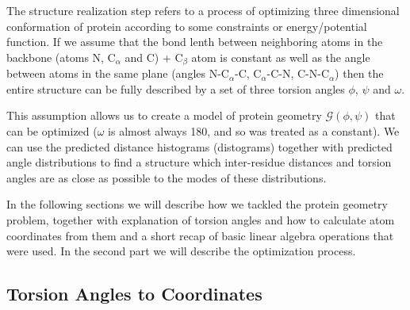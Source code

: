 The structure realization step refers to a process of optimizing three dimensional conformation of protein according to some constraints or energy/potential function. If we assume that the bond lenth between neighboring atoms in the backbone (atoms N, C$_\alpha$ and C) + C$_\beta$ atom is constant as well as the angle between atoms in the same plane (angles N-C$_{\alpha}$-C, C$_{\alpha}$-C-N, C-N-C$_{\alpha}$) then the entire structure can be fully described by a set of three torsion angles $\phi$, $\psi$ and $\omega$.

This assumption allows us to create a model of protein geometry $\mathcal{G}(\phi, \psi)$ that can be optimized ($\omega$ is almost always 180\degree, and so was treated as a constant). We can use the predicted distance histograms (distograms) together with predicted angle distributions to find a structure which inter-residue distances and torsion angles are as close as possible to the modes of these distributions.

In the following sections we will describe how we tackled the protein geometry problem, together with explanation of torsion angles and how to calculate atom coordinates from them and a short recap of basic linear algebra operations that were used. In the second part we will describe the optimization process.

\subsection{Torsion Angles to Coordinates}




